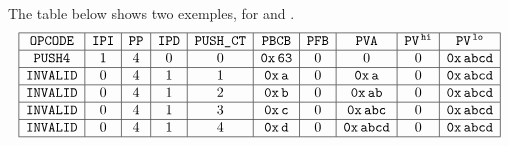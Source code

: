The table below shows two exemples, for  and .
\[
    \begin{array}{|c|c|c|c|c|c|c|c|c|c|}
        \hline
        \texttt{OPCODE}           & \texttt{IPI}{} & \texttt{PP}{} & \texttt{IPD}{} & \texttt{PUSH\_CT}{} & \texttt{PBCB}{}         & \texttt{PFB}{} & \texttt{PVA}                 & \texttt{PV}^{\mathtt{\,hi}}{} & \texttt{PV}^{\mathtt{\,lo}}{}         \\\hline
        \texttt{PUSH4}   & 1     & 4     & 0      & 0     & \mathtt{0x\,63} & 0      & 0                    & 0          & \mathtt{0x\,abcd} \\\hline
        \texttt{INVALID} & 0     & 4     & 1      & 1     & \mathtt{0x\,a}  & 0      & \mathtt{0x\,a}       & 0          & \mathtt{0x\,abcd} \\\hline
        \texttt{INVALID} & 0     & 4     & 1      & 2     & \mathtt{0x\,b}  & 0      & \mathtt{0x\,ab}      & 0          & \mathtt{0x\,abcd} \\\hline
        \texttt{INVALID} & 0     & 4     & 1      & 3     & \mathtt{0x\,c}  & 0      & \mathtt{0x\,abc}     & 0          & \mathtt{0x\,abcd} \\\hline
        \texttt{INVALID} & 0     & 4     & 1      & 4     & \mathtt{0x\,d}  & 0      & \mathtt{0x\,abcd}    & 0          & \mathtt{0x\,abcd} \\\hline
    \end{array}
\]


